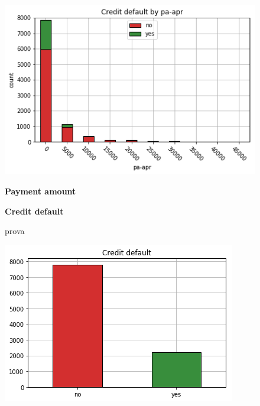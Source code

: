 \smallskip
\begin{figure}[h]
  \begin{minipage}[h]{.50\textwidth}
    \includegraphics[width=.95\textwidth]{img/ch2/payment_amount_1}
  \end{minipage}
  \begin{minipage}[h]{.50\textwidth}
        {\Large \textbf{Payment amount}}
  \end{minipage}
\end{figure}
\smallskip
\begin{figure}[ht]
  \begin{minipage}[h]{.60\textwidth}
        {\Large \textbf{Credit default}}
        
        prova
  \end{minipage}
  \begin{minipage}[h]{.40\textwidth}
    \includegraphics[width=.95\textwidth]{img/ch2/credit_default}
  \end{minipage}
\end{figure}

